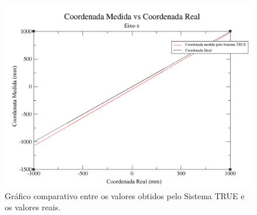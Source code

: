	\begin{figure}[htb]
		\begin{center}
			\includegraphics[scale=0.4]{figuras/5.Testes/grafico-eixo-x.png}
		\end{center}
		\caption{Gráfico comparativo entre os valores obtidos pelo Sistema TRUE e os valores reais.}
		\label{fig:grafico-eixox}
	\end{figure}

































